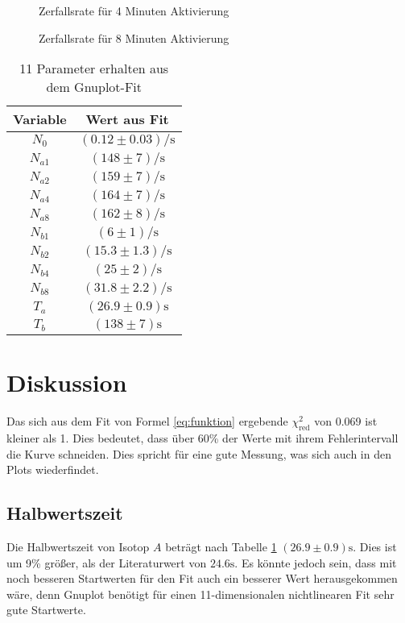 \documentclass[12pt,a4paper,titlepage,headinclude,bibtotoc]{scrartcl}
\begin{document}
\begin{figure}[h]
\centering

\caption{Zerfallsrate für 4 Minuten Aktivierung}
\label{fig:4min}
\end{figure}

\begin{figure}[h]
\centering

\caption{Zerfallsrate für 8 Minuten Aktivierung}
\label{fig:8min}
\end{figure}


\begin{table}
\centering
\begin{tabular}{|c|c|}
\hline
Variable & Wert aus Fit \\\hline\hline
$N_0  $          &$(0.12\pm 0.03)\si{\per\second} $\\\hline\hline
$ N_{a1} $          &$(148\pm 7  )\si{\per\second}  $\\\hline
$ N_{a2} $          &$(159\pm 7)\si{\per\second}   $\\\hline
$ N_{a4} $          &$(164\pm 7)\si{\per\second}   $\\\hline
$N_{a8} $          &$(162\pm 8 )\si{\per\second}  $\\\hline\hline
$N_{b1} $          &$(6\pm 1     )\si{\per\second}  $\\\hline
$N_{b2} $          &$(15.3\pm 1.3 )\si{\per\second}  $\\\hline
$N_{b4} $          &$(25\pm 2 )\si{\per\second}  $\\\hline
$N_{b8} $          &$(31.8\pm 2.2 )\si{\per\second}  $\\\hline\hline
$T_a  $          &$(26.9   \pm 0.9) \si\second  $\\\hline
$T_b  $          &$(138  \pm 7)\si\second    $\\\hline
\end{tabular}
\caption{11  Parameter erhalten aus dem Gnuplot-Fit}
\label{tab:parameter}
\end{table}


\section{Diskussion}
\label{sec:diskussion}
Das sich aus dem Fit von Formel \eqref{eq:funktion} ergebende $\chi_\text{red}^2$ von 0.069 ist kleiner als 1.
Dies bedeutet, dass über 60\% der Werte mit ihrem Fehlerintervall die Kurve schneiden.
Dies spricht für eine gute Messung, was sich auch in den Plots wiederfindet.

\subsection{Halbwertszeit}
Die Halbwertszeit von Isotop $A$ beträgt nach Tabelle \ref{tab:parameter} $(26.9 \pm 0.9)\si\second$.
Dies ist um 9\% größer, als der Literaturwert von $24.6\si\second$.
Es könnte jedoch sein, dass mit noch besseren Startwerten für den Fit auch ein besserer Wert herausgekommen wäre, denn Gnuplot benötigt für einen 11-dimensionalen nichtlinearen Fit sehr gute Startwerte.
\end{document}
